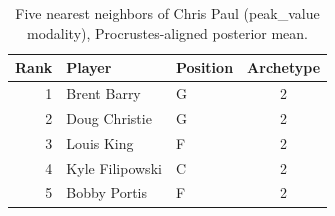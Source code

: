 \begin{table}[htbp]
  \centering\small
  \begin{tabular}{rllc}
    \toprule
    Rank & Player & Position & Archetype \\
    \midrule
    1 & Brent Barry & G & 2 \\
    2 & Doug Christie & G & 2 \\
    3 & Louis King & F & 2 \\
    4 & Kyle Filipowski & C & 2 \\
    5 & Bobby Portis & F & 2 \\
    \bottomrule
  \end{tabular}
  \caption{Five nearest neighbors of Chris Paul (peak_value modality), Procrustes-aligned posterior mean.}
  \label{tab:Chris_Paul_neighbors_peak_value}
\end{table}


